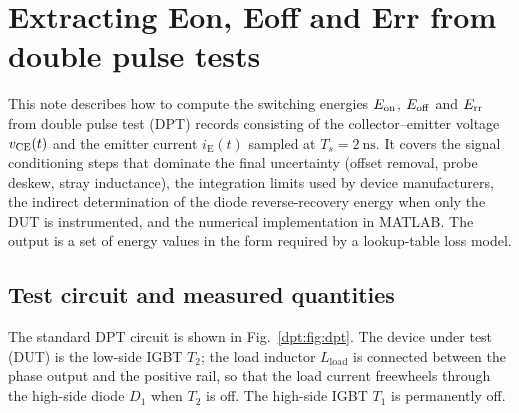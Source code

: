 \chapter{Extracting Eon, Eoff and Err from double pulse tests}
\label{ch:dpt}
\begin{chapabstract}
This note describes how to compute the switching energies $E_{\mathrm{on}}$, $E_{\mathrm{off}}$ and $E_{\mathrm{rr}}$
from double pulse test (DPT) records consisting of the collector--emitter voltage
$v_{\mathrm{CE}}(t)$ and the emitter current $i_{\mathrm{E}}(t)$ sampled at
$T_s=\SI{2}{\nano\second}$. It covers the signal conditioning steps that dominate the
final uncertainty (offset removal, probe deskew, stray inductance), the integration
limits used by device manufacturers, the indirect determination of the diode
reverse-recovery energy when only the DUT is instrumented, and the numerical
implementation in MATLAB. The output is a set of energy values in the form required by
a lookup-table loss model.
\end{chapabstract}

\section{Test circuit and measured quantities}

The standard DPT circuit is shown in Fig.~\ref{dpt:fig:dpt}. The device under test (DUT) is
the low-side IGBT $T_2$; the load inductor $L_{\mathrm{load}}$ is connected between the
phase output and the positive rail, so that the load current freewheels through the
high-side diode $D_1$ when $T_2$ is off. The high-side IGBT $T_1$ is permanently off.

